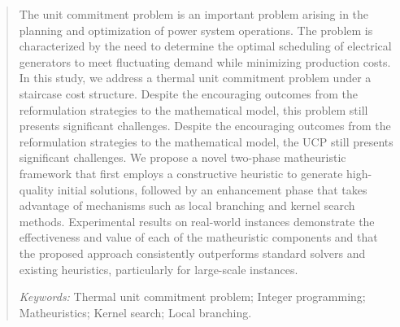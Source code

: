 \documentclass[letterpaper,titlepage,11pt]{article}
\begin{document}
\begin{abstract}
The unit commitment problem is an important problem 
arising in the planning and optimization of power system operations.
The problem is characterized by the need to determine the optimal scheduling of electrical generators to meet fluctuating demand while minimizing production costs.
In this study, we address a thermal unit commitment problem under
a staircase cost structure. 
Despite the encouraging outcomes from the reformulation strategies to the mathematical model, this problem still presents significant challenges.
%
Despite the encouraging outcomes from the reformulation strategies to the mathematical model, the UCP still presents significant challenges.
%
We propose a novel two-phase matheuristic framework that first employs a constructive heuristic to generate high-quality initial solutions, followed by an enhancement phase that takes advantage of mechanisms such as local branching and kernel search methods. 
%
Experimental results on real-world instances demonstrate the effectiveness and value of each of the matheuristic components and that the proposed approach consistently outperforms standard solvers and existing heuristics, particularly for large-scale instances.
%

\vspace{1em}
\noindent\textit{Keywords:} Thermal unit commitment problem; Integer programming; Matheuristics; Kernel search; Local branching.
\end{abstract}











 


\newpage
\appendix

\end{document}
